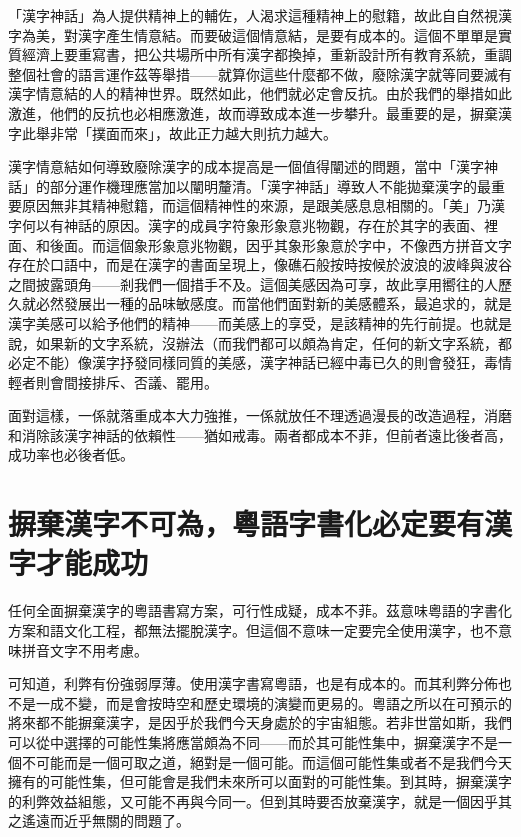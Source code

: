 \documentclass[a5paper, 10pt, openany]{book} %
\begin{document}
「漢字神話」為人提供精神上的輔佐，人渴求這種精神上的慰籍，故此自自然視漢字為美，對漢字產生情意結。而要破這個情意結，是要有成本的。這個不單單是實質經濟上要重寫書，把公共場所中所有漢字都換掉，重新設計所有教育系統，重調整個社會的語言運作茲等舉措——就算你這些什麼都不做，廢除漢字就等同要滅有漢字情意結的人的精神世界。既然如此，他們就必定會反抗。由於我們的舉措如此激進，他們的反抗也必相應激進，故而導致成本進一步攀升。最重要的是，摒棄漢字此舉非常「撲面而來」，故此正力越大則抗力越大。

漢字情意結如何導致廢除漢字的成本提高是一個值得闡述的問題，當中「漢字神話」的部分運作機理應當加以闡明釐清。「漢字神話」導致人不能拋棄漢字的最重要原因無非其精神慰籍，而這個精神性的來源，是跟美感息息相關的。「美」乃漢字何以有神話的原因。漢字的成員字符象形象意兆物觀，存在於其字的表面、裡面、和後面。而這個象形象意兆物觀，因乎其象形象意於字中，不像西方拼音文字存在於口語中，而是在漢字的書面呈現上，像礁石般按時按候於波浪的波峰與波谷之間披露頭角——剎我們一個措手不及。這個美感因為可享，故此享用嚮往的人歷久就必然發展出一種的品味敏感度。而當他們面對新的美感體系，最追求的，就是漢字美感可以給予他們的精神——而美感上的享受，是該精神的先行前提。也就是說，如果新的文字系統，沒辦法（而我們都可以頗為肯定，任何的新文字系統，都必定不能）像漢字抒發同樣同質的美感，漢字神話已經中毒已久的則會發狂，毒情輕者則會間接排斥、否議、罷用。

面對這樣，一係就落重成本大力強推，一係就放任不理透過漫長的改造過程，消磨和消除該漢字神話的依賴性——猶如戒毒。兩者都成本不菲，但前者遠比後者高，成功率也必後者低。

\section{摒棄漢字不可為，粵語字書化必定要有漢字才能成功}

任何全面摒棄漢字的粵語書寫方案，可行性成疑，成本不菲。茲意味粵語的字書化方案和語文化工程，都無法擺脫漢字。但這個不意味一定要完全使用漢字，也不意味拼音文字不用考慮。

可知道，利弊有份強弱厚薄。使用漢字書寫粵語，也是有成本的。而其利弊分佈也不是一成不變，而是會按時空和歷史環境的演變而更易的。粵語之所以在可預示的將來都不能摒棄漢字，是因乎於我們今天身處於的宇宙組態。若非世當如斯，我們可以從中選擇的可能性集將應當頗為不同——而於其可能性集中，摒棄漢字不是一個不可能而是一個可取之道，絕對是一個可能。而這個可能性集或者不是我們今天擁有的可能性集，但可能會是我們未來所可以面對的可能性集。到其時，摒棄漢字的利弊效益組態，又可能不再與今同一。但到其時要否放棄漢字，就是一個因乎其之遙遠而近乎無關的問題了。
\end{document}
